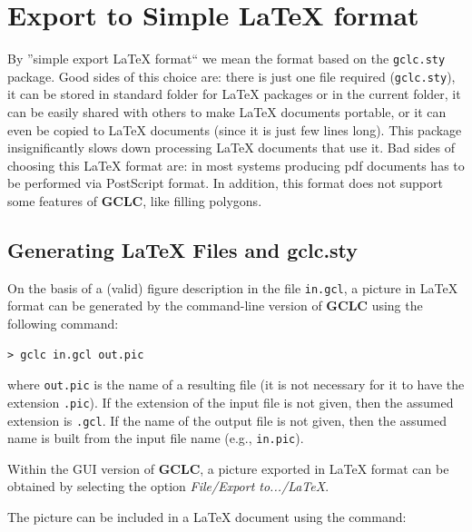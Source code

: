 \documentclass[a4paper]{book}
\newcommand{\gclc}{{\bfseries GCLC}\xspace}
\begin{document}
\section{Export to Simple \LaTeX{} format}

By ''simple export \LaTeX{} format`` we mean the format based on
the \verb|gclc.sty| package. Good sides of this choice are:
there is just one file required (\verb|gclc.sty|), it can be
stored in standard folder for \LaTeX{} packages or in the current
folder, it can be easily shared with others to make \LaTeX{}
documents portable, or it can even be copied to \LaTeX{} documents
(since it is just few lines long). This package insignificantly
slows down processing \LaTeX{} documents that use it.
Bad sides of choosing this \LaTeX{} format are: in most systems
producing {\sc pdf} documents has to be performed via {\sc PostScript}
format. In addition, this format does not support some features
of \gclc, like filling polygons.


\subsection{Generating \LaTeX{} Files and {\sc gclc.sty}}

On the basis of a (valid) figure description in the file \verb|in.gcl|,
a picture in \LaTeX{} format can be generated by the command-line
version of \gclc using the following command:

\begin{verbatim}
> gclc in.gcl out.pic
\end{verbatim}

\noindent
where \verb|out.pic| is the name of a resulting file (it is not
necessary for it to have the extension \verb|.pic|).
If the extension of the input file is not given, then the assumed
extension is \verb|.gcl|.
If the name of the output file is not given, then the assumed name
is built from the input file name (e.g., \verb|in.pic|).

Within the GUI version of \gclc, a picture exported in \LaTeX{} format 
can be obtained by selecting the option {\it File/Export to.../LaTeX}.

The picture can be included in a \LaTeX{} document using the
command:

\begin{verbatim}

\end{verbatim}
\end{document}
